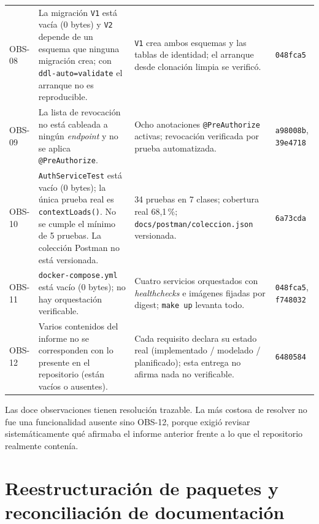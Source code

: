 \documentclass[11pt,a4paper]{article}
\newcommand{\ruta}[1]{\texttt{\footnotesize #1}}
\begin{document}
\begin{longtable}{@{}p{1.3cm}p{6.6cm}p{5.3cm}p{1.6cm}@{}}
OBS-08 & La migración \texttt{V1} está vacía (0 bytes) y \texttt{V2}
depende de un esquema que ninguna migración crea; con
\texttt{ddl-auto=validate} el arranque no es reproducible. & \texttt{V1}
crea ambos esquemas y las tablas de identidad; el arranque desde clonación
limpia se verificó. & \texttt{048fca5} \\

OBS-09 & La lista de revocación no está cableada a ningún
\emph{endpoint} y no se aplica \texttt{@PreAuthorize}. & Ocho anotaciones
\texttt{@PreAuthorize} activas; revocación verificada por prueba
automatizada. & \texttt{a98008b}, \texttt{39e4718} \\

OBS-10 & \texttt{AuthServiceTest} está vacío (0 bytes); la única prueba
real es \texttt{contextLoads()}. No se cumple el mínimo de 5 pruebas. La
colección Postman no está versionada. & 34 pruebas en 7 clases; cobertura
real 68,1\,\%; \ruta{docs/postman/coleccion.json} versionada. &
\texttt{6a73cda} \\

OBS-11 & \texttt{docker-compose.yml} está vacío (0 bytes); no hay
orquestación verificable. & Cuatro servicios orquestados con
\emph{healthchecks} e imágenes fijadas por digest; \texttt{make up} levanta
todo. & \texttt{048fca5}, \texttt{f748032} \\

OBS-12 & Varios contenidos del informe no se corresponden con lo presente
en el repositorio (están vacíos o ausentes). & Cada requisito declara su
estado real (implementado / modelado / planificado); esta entrega no afirma
nada no verificable. & \texttt{6480584} \\

\bottomrule
\end{longtable}
\renewcommand{\arraystretch}{1}

Las doce observaciones tienen resolución trazable. La más costosa de
resolver no fue una funcionalidad ausente sino OBS-12, porque exigió revisar
sistemáticamente qué afirmaba el informe anterior frente a lo que el
repositorio realmente contenía.

\section{Reestructuración de paquetes y reconciliación de documentación}
\label{sec:reestructuracion}
\end{document}
